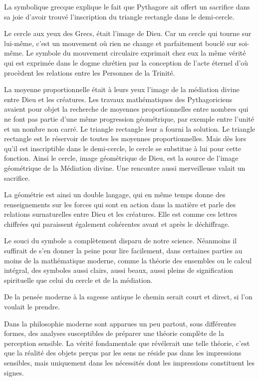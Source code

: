 \documentclass[french,twoside]{book} %
\begin{document}
La symbolique grecque explique le fait que Pythagore ait offert un sacrifice dans sa joie d'avoir trouvé l'inscription du triangle rectangle dans le demi-cercle.\par
Le cercle aux yeux des Grecs, était l'image de Dieu. Car un cercle qui tourne sur lui-même, c'est un mouvement où rien ne change et parfaitement bouclé sur soi-même. Le symbole du mouvement circulaire exprimait chez eux la même vérité qui est exprimée dans le dogme chrétien par la conception de l'acte éternel d'où procèdent les relations entre les Personnes de la Trinité.\par
La moyenne proportionnelle était à leurs yeux l'image de la médiation divine entre Dieu et les créatures. Les travaux mathématiques des Pythagoriciens avaient pour objet la recherche de moyennes proportionnelles entre nombres qui ne font pas partie d'une même progression géométrique, par exemple entre l'unité et un nombre non carré. Le triangle rectangle leur a fourni la solution. Le triangle rectangle est le réservoir de toutes les moyennes proportionnelles. Mais dès lors qu'il est inscriptible dans le demi-cercle, le cercle se substitue à lui pour cette fonction. Ainsi le cercle, image géométrique de Dieu, est la source de l'image géométrique de la Médiation divine. Une rencontre aussi merveilleuse valait un sacrifice.\par
La géométrie est ainsi un double langage, qui en même temps donne des renseignements sur les forces qui sont en action dans la matière et parle des relations surnaturelles entre Dieu et les créatures. Elle est comme ces lettres chiffrées qui paraissent également cohérentes avant et après le déchiffrage.\par
Le souci du symbole a complètement disparu de notre science. Néanmoins il suffirait de s'en donner la peine pour lire facilement, dans certaines parties au moins de la mathématique moderne, comme la théorie des ensembles ou le calcul intégral, des symboles aussi clairs, aussi beaux, aussi pleins de signification spirituelle que celui du cercle et de la médiation.\par
De la pensée moderne à la sagesse antique le chemin serait court et direct, si l'on voulait le prendre.\par
Dans la philosophie moderne sont apparues un peu partout, sous différentes formes, des analyses susceptibles de préparer une théorie complète de la perception sensible. La vérité fondamentale que révélerait une telle théorie, c'est que la réalité des objets perçus par les sens ne réside pas dans les impressions sensibles, mais uniquement dans les nécessités dont les impressions constituent les signes.\par
\end{document}

